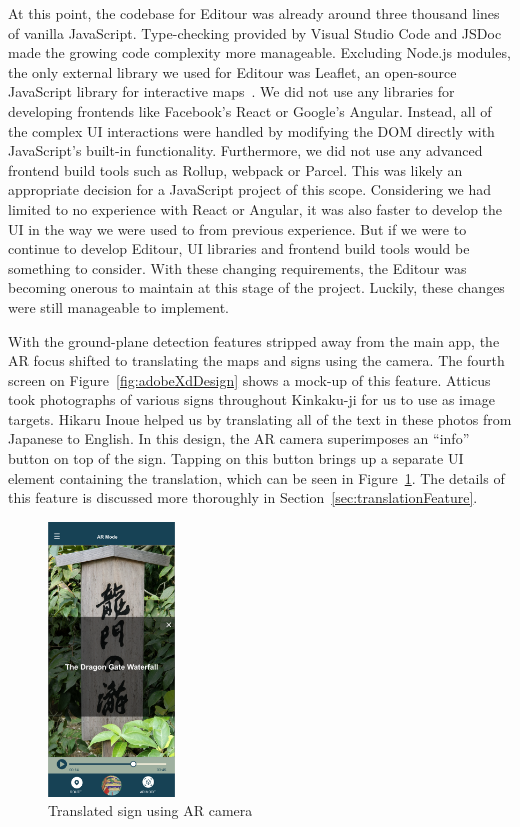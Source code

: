 \documentclass[a4paper, 10pt, american, titlepage]{article}
\begin{document}
At this point, the codebase for Editour was already around three thousand lines
of vanilla JavaScript. Type-checking provided by Visual Studio Code and JSDoc
made the growing code complexity more manageable. Excluding Node.js modules,
the only external library we used for Editour was Leaflet, an open-source
JavaScript library for interactive maps~\autocite{leafletjs}. We did not use
any libraries for developing frontends like Facebook's React or Google's
Angular. Instead, all of the complex UI interactions were handled by modifying
the DOM directly with JavaScript's built-in functionality. Furthermore, we did
not use any advanced frontend build tools such as Rollup, webpack or Parcel.
This was likely an appropriate decision for a JavaScript project of this scope.
Considering we had limited to no experience with React or Angular, it was also
faster to develop the UI in the way we were used to from previous experience.
But if we were to continue to develop Editour, UI libraries and frontend build
tools would be something to consider. With these changing requirements, the
Editour was becoming onerous to maintain at this stage of the project. Luckily,
these changes were still manageable to implement.

With the ground-plane detection features stripped away from the main app, the
AR focus shifted to translating the maps and signs using the camera. The fourth
screen on Figure~\ref{fig:adobeXdDesign} shows a mock-up of this feature.
Atticus took photographs of various signs throughout Kinkaku-ji for us to use
as image targets. Hikaru Inoue helped us by translating all of the text in
these photos from Japanese to English. In this design, the AR camera
superimposes an ``info'' button on top of the sign. Tapping on this button
brings up a separate UI element containing the translation, which can be seen
in Figure~\ref{fig:signTranslation}. The details of this feature is discussed
more thoroughly in Section~\ref{sec:translationFeature}.

\begin{figure}[h] \centering
    \includegraphics[width=0.3\textwidth]{sign-translation.png}
    \caption{Translated sign using AR camera}
    \label{fig:signTranslation}
\end{figure}
\end{document}
